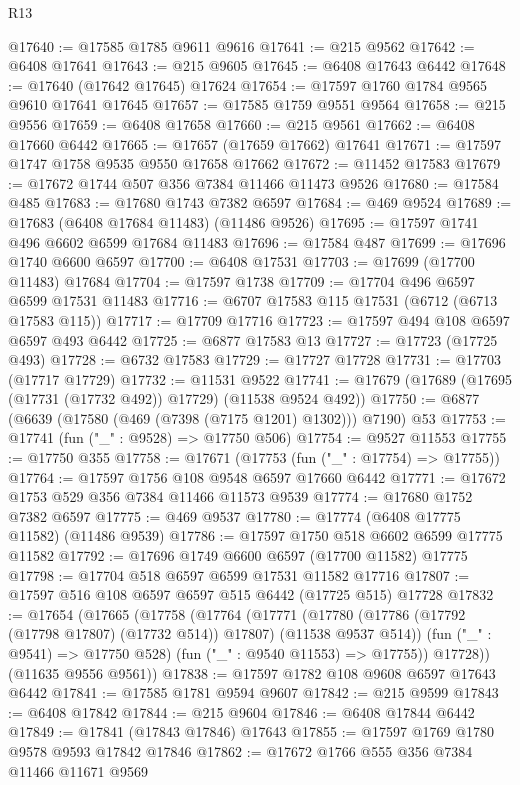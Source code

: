 \begin{lexlean}{R13}
\begin{coremodule}
@17640 := @17585 @1785 @9611 @9616
@17641 := @215 @9562
@17642 := @6408 @17641
@17643 := @215 @9605
@17645 := @6408 @17643 @6442
@17648 := @17640 (@17642 @17645) @17624
@17654 := @17597 @1760 @1784 @9565 @9610 @17641 @17645
@17657 := @17585 @1759 @9551 @9564
@17658 := @215 @9556
@17659 := @6408 @17658
@17660 := @215 @9561
@17662 := @6408 @17660 @6442
@17665 := @17657 (@17659 @17662) @17641
@17671 := @17597 @1747 @1758 @9535 @9550 @17658 @17662
@17672 := @11452 @17583
@17679 := @17672 @1744 @507 @356 @7384 @11466 @11473 @9526
@17680 := @17584 @485
@17683 := @17680 @1743 @7382 @6597
@17684 := @469 @9524
@17689 := @17683 (@6408 @17684 @11483) (@11486 @9526)
@17695 := @17597 @1741 @496 @6602 @6599 @17684 @11483
@17696 := @17584 @487
@17699 := @17696 @1740 @6600 @6597
@17700 := @6408 @17531
@17703 := @17699 (@17700 @11483) @17684
@17704 := @17597 @1738
@17709 := @17704 @496 @6597 @6599 @17531 @11483
@17716 := @6707 @17583 @115 @17531 (@6712 (@6713 @17583 @115))
@17717 := @17709 @17716
@17723 := @17597 @494 @108 @6597 @6597 @493 @6442
@17725 := @6877 @17583 @13
@17727 := @17723 (@17725 @493)
@17728 := @6732 @17583
@17729 := @17727 @17728
@17731 := @17703 (@17717 @17729)
@17732 := @11531 @9522
@17741 := @17679 (@17689 (@17695 (@17731 (@17732 @492)) @17729) (@11538 @9524 @492))
@17750 := @6877 (@6639 (@17580 (@469 (@7398 (@7175 @1201) @1302))) @7190) @53
@17753 := @17741 (fun ("_" : @9528) => @17750 @506)
@17754 := @9527 @11553
@17755 := @17750 @355
@17758 := @17671 (@17753 (fun ("_" : @17754) => @17755))
@17764 := @17597 @1756 @108 @9548 @6597 @17660 @6442
@17771 := @17672 @1753 @529 @356 @7384 @11466 @11573 @9539
@17774 := @17680 @1752 @7382 @6597
@17775 := @469 @9537
@17780 := @17774 (@6408 @17775 @11582) (@11486 @9539)
@17786 := @17597 @1750 @518 @6602 @6599 @17775 @11582
@17792 := @17696 @1749 @6600 @6597 (@17700 @11582) @17775
@17798 := @17704 @518 @6597 @6599 @17531 @11582 @17716
@17807 := @17597 @516 @108 @6597 @6597 @515 @6442 (@17725 @515) @17728
@17832 := @17654
    (@17665
      (@17758
        (@17764
          (@17771
            (@17780 (@17786 (@17792 (@17798 @17807) (@17732 @514)) @17807) (@11538 @9537 @514))
            (fun ("_" : @9541) => @17750 @528)
            (fun ("_" : @9540 @11553) => @17755))
          @17728))
      (@11635 @9556 @9561))
@17838 := @17597 @1782 @108 @9608 @6597 @17643 @6442
@17841 := @17585 @1781 @9594 @9607
@17842 := @215 @9599
@17843 := @6408 @17842
@17844 := @215 @9604
@17846 := @6408 @17844 @6442
@17849 := @17841 (@17843 @17846) @17643
@17855 := @17597 @1769 @1780 @9578 @9593 @17842 @17846
@17862 := @17672 @1766 @555 @356 @7384 @11466 @11671 @9569

\end{coremodule}
\end{lexlean}
